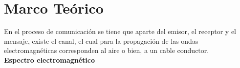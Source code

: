 \chapter{Marco Teórico}

%

En el proceso de comunicación se tiene que aparte del emisor, el receptor y el mensaje, existe el canal, el cual para la propagación de las ondas electromagnéticas corresponden al aire o bien, a un cable conductor.\\

\textbf{Espectro electromagnético}


